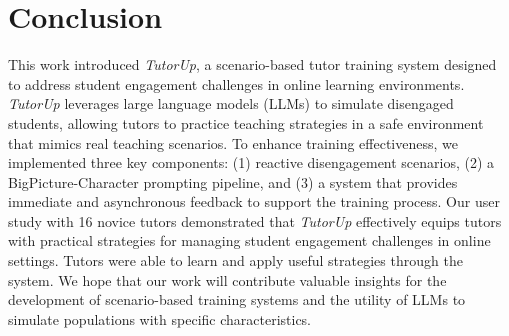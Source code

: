 \section{Conclusion}

This work introduced \textit{TutorUp}, a scenario-based tutor training system designed to address student engagement challenges in online learning environments. \textit{TutorUp} leverages large language models (LLMs) to simulate disengaged students, allowing tutors to practice teaching strategies in a safe environment that mimics real teaching scenarios. To enhance training effectiveness, we implemented three key components: (1) reactive disengagement scenarios, (2) a BigPicture-Character prompting pipeline, and (3) a system that provides immediate and asynchronous feedback to support the training process.
%
Our user study with 16 novice tutors demonstrated that \textit{TutorUp} effectively equips tutors with practical strategies for managing student engagement challenges in online settings. Tutors were able to learn and apply useful strategies through the system. We hope that our work will contribute valuable insights for the development of scenario-based training systems and the utility of LLMs to simulate populations with specific characteristics.
\label{sec:conclusion}
